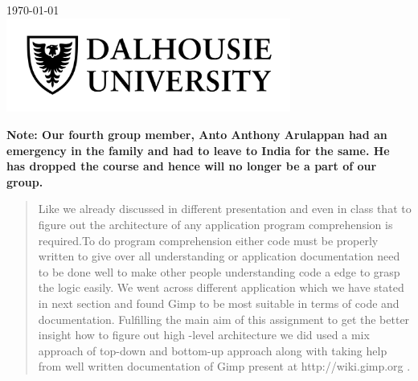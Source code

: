 \begin{titlepage}

{\large \today}\\[2cm] %


\includegraphics[width=0.7\textwidth]{dal.jpg}%
 

\vfill %

\end{titlepage}
\newpage
\textbf{Note: Our fourth group member, Anto Anthony Arulappan had an emergency in the family and had to leave to India for the same. He has dropped the course and hence will no longer be a part of our group.}
\newpage
\tableofcontents
\newpage

\begin{abstract}
Like we already discussed in different presentation and even in class that to figure out the architecture of any application program comprehension is required.To do program comprehension either code must be properly written to give over all understanding or application documentation need to be done well to make other people understanding code a edge to grasp the logic easily. We went across different application which we have stated in next section and found Gimp to be most suitable in terms of code and documentation. Fulfilling the main aim of this assignment to get the better insight how to figure out high -level architecture we did used a mix approach of top-down and bottom-up approach along with taking help from well written documentation of Gimp present at http://wiki.gimp.org . 
\end{abstract}

